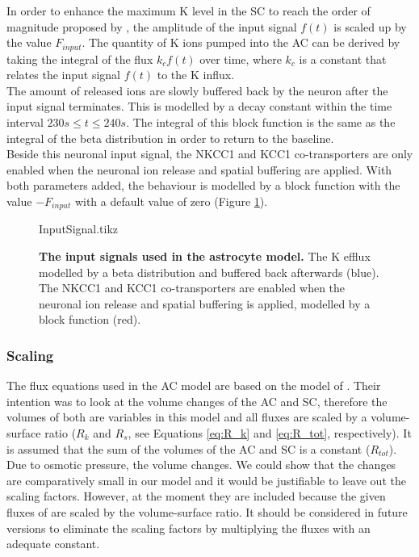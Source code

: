 In order to enhance the maximum \gls{K} level in the SC to reach the order of magnitude proposed by \citet{Filosa2004}, the amplitude of the input signal $f(t)$ is scaled up by the value $F_{input}$. The quantity of \gls{K} ions pumped into the AC can be derived by taking the integral of the flux $k_c f(t)$ over time, where $k_c$ is a constant that relates the input signal $f(t)$ to the \gls{K} influx. \\

The amount of released  ions are slowly buffered back by the neuron after the input signal terminates. This is modelled by a decay constant within the time interval $ 230 s \leq t \leq 240 s$. The integral of this block function is the same as the integral of the beta distribution in order to return to the baseline.\\

Beside this neuronal input signal, the NKCC1 and KCC1 co-transporters are only enabled when the neuronal ion release and spatial buffering are applied.  With both parameters added, the behaviour is modelled by a block function with the value $-F_{input}$ with a default value of zero (Figure \ref{fig:InputSignal}). \\
%
%
\begin{figure}[h!]
	\centering
	\footnotesize %
	\newlength\figureheight 
	\newlength\figurewidth 
	\setlength\figureheight{6cm} 
	\setlength\figurewidth{10 cm}
	{InputSignal.tikz}
	\caption{\textbf{The input signals used in the astrocyte model.} The \gls{K} efflux modelled by a beta distribution and buffered back afterwards (blue). The NKCC1 and KCC1 co-transporters are enabled when the neuronal ion release and spatial buffering is applied, modelled by a block function (red).  }
	\label{fig:InputSignal}
\end{figure}
% 
%
\subsubsection{Scaling}
The flux equations used in the AC model are based on the model of \citet{Ostby2009}. Their intention was to look at the volume changes of the AC and SC, therefore the volumes of both are variables in this model and all fluxes are scaled by a volume-surface ratio ($R_k$ and $R_s$, see Equations \ref{eq:R_k} and \ref{eq:R_tot}, respectively). It is assumed that the sum of the volumes of the AC and SC is a constant ($R_{tot}$). Due to osmotic pressure, the volume changes. We could show that the changes are comparatively small in our model and it would be justifiable to leave out the scaling factors. However, at the moment they are included because the given fluxes of \citet{Ostby2009} are scaled by the volume-surface ratio. It should be considered in future versions to eliminate the scaling factors by multiplying the fluxes with an adequate constant. 




